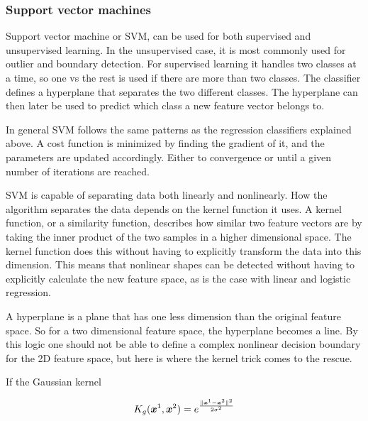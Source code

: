     
            
        
            \subsubsection{Support vector machines}
            
            Support vector machine or SVM, can be used for both supervised and unsupervised learning. In the unsupervised case, it is most commonly used for outlier and boundary detection. For supervised learning it handles two classes at a time, so one vs the rest is used if there are more than two classes. The classifier defines a hyperplane that separates the two different classes. The hyperplane can then later be used to predict which class a new feature vector belongs to.  
            
            In general SVM follows the same patterns as the regression classifiers explained above. A cost function is minimized by finding the gradient of it, and the parameters are updated accordingly. Either to convergence or until a given number of iterations are reached. 
            
            SVM is capable of separating data both linearly and nonlinearly. How the algorithm separates the data depends on the kernel function it uses. A kernel function, or a similarity function, describes how similar two feature vectors are by taking the inner product of the two samples in a higher dimensional space. The kernel function does this without having to explicitly transform the data into this dimension. This means that nonlinear shapes can be detected without having to explicitly calculate the new feature space, as is the case with linear and logistic regression. 
            
            A hyperplane is a plane that has one less dimension than the original feature space. So for a two dimensional feature space, the hyperplane becomes a line. By this logic one should not be able to define a complex nonlinear decision boundary for the 2D feature space, but here is where the kernel trick comes to the rescue. 
            
            If the Gaussian kernel
            
            \begin{align}
                K_g(\bm x^{1},\bm x^{2}) = e^{\frac{\lVert\bm x^{1}-\bm x^{2}\rVert^2}{2\sigma^2}} 
                \label{svm:gauss}
            \end{align}
            
